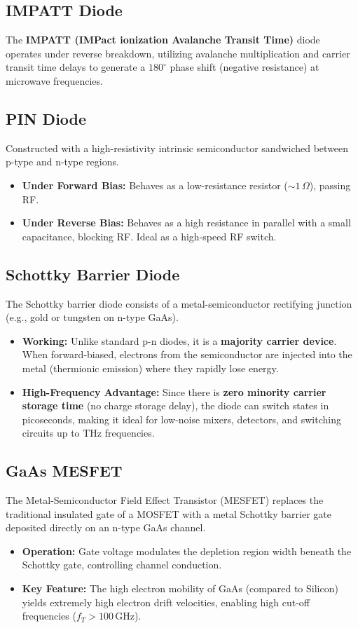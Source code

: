 \documentclass[12pt,a4paper]{article}
\begin{document}
\subsection{IMPATT Diode}
The \textbf{IMPATT (IMPact ionization Avalanche Transit Time)} diode operates under reverse breakdown, utilizing avalanche multiplication and carrier transit time delays to generate a $180^\circ$ phase shift (negative resistance) at microwave frequencies.

\subsection{PIN Diode}
Constructed with a high-resistivity intrinsic semiconductor sandwiched between p-type and n-type regions.
\begin{itemize}[leftmargin=*, itemsep=3pt]
  \item \textbf{Under Forward Bias:} Behaves as a low-resistance resistor ($\sim 1\,\Omega$), passing RF.
  \item \textbf{Under Reverse Bias:} Behaves as a high resistance in parallel with a small capacitance, blocking RF. Ideal as a high-speed RF switch.
\end{itemize}

\subsection{Schottky Barrier Diode}
The Schottky barrier diode consists of a metal-semiconductor rectifying junction (e.g., gold or tungsten on n-type GaAs).
\begin{itemize}[leftmargin=*, itemsep=3pt]
  \item \textbf{Working:} Unlike standard p-n diodes, it is a \textbf{majority carrier device}. When forward-biased, electrons from the semiconductor are injected into the metal (thermionic emission) where they rapidly lose energy.
  \item \textbf{High-Frequency Advantage:} Since there is \textbf{zero minority carrier storage time} (no charge storage delay), the diode can switch states in picoseconds, making it ideal for low-noise mixers, detectors, and switching circuits up to THz frequencies.
\end{itemize}

\subsection{GaAs MESFET}
The Metal-Semiconductor Field Effect Transistor (MESFET) replaces the traditional insulated gate of a MOSFET with a metal Schottky barrier gate deposited directly on an n-type GaAs channel.
\begin{itemize}[leftmargin=*, itemsep=3pt]
  \item \textbf{Operation:} Gate voltage modulates the depletion region width beneath the Schottky gate, controlling channel conduction.
  \item \textbf{Key Feature:} The high electron mobility of GaAs (compared to Silicon) yields extremely high electron drift velocities, enabling high cut-off frequencies ($f_T > 100\,\text{GHz}$).
\end{itemize}
\end{document}
